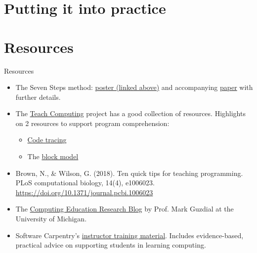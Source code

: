\documentclass[10pt]{beamer}
\begin{document}
\section{Putting it into practice}

\section{Resources}

\begin{frame}{Resources}
    \begin{itemize}
        \item The Seven Steps method: \href{http://adhilton.pratt.duke.edu/sites/adhilton.pratt.duke.edu/files/u37/iticse-7steps.pdf}{poster (linked above)} and accompanying \href{https://dl.acm.org/doi/10.1145/3300115.3309508}{paper} with further details.
        \item The \href{https://teachcomputing.org/pedagogy}{Teach Computing} project has a good collection of resources. Highlights on 2 resources to support program comprehension:
            \begin{itemize}
                \item \href{https://blog.teachcomputing.org/code-tracing/}{Code tracing}
                \item The \href{https://blog.teachcomputing.org/quick-read-understanding-program-comprehension-using-the-block-model/}{block model}
            \end{itemize}
        \item Brown, N., \& Wilson, G. (2018). Ten quick tips for teaching programming. PLoS computational biology, 14(4), e1006023. \url{https://doi.org/10.1371/journal.pcbi.1006023}
        \item The \href{https://computinged.wordpress.com/about/}{Computing Education Research Blog} by Prof. Mark Guzdial at the University of Michigan.
        \item Software Carpentry's \href{https://carpentries.github.io/instructor-training/}{instructor training material}. Includes evidence-based, practical advice on supporting students in learning computing.
    \end{itemize}
\end{frame}
\end{document}
